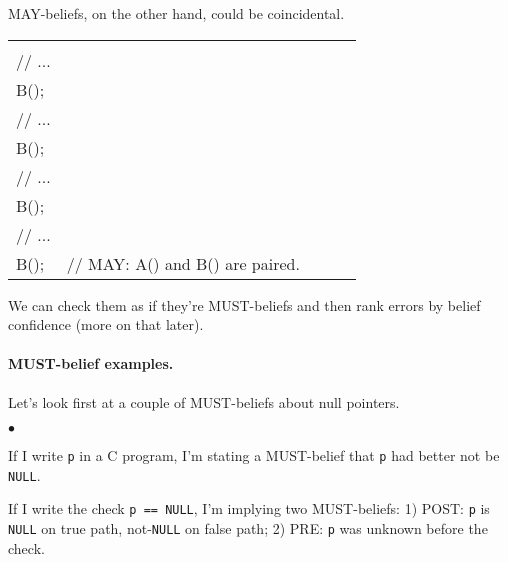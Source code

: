\documentclass[11pt]{article}
\newcommand{\squishlist}{
 \begin{list}{$\bullet$}
  { \setlength{\itemsep}{0pt}
     \setlength{\parsep}{3pt}
     \setlength{\topsep}{3pt}
     \setlength{\partopsep}{0pt}
     \setlength{\leftmargin}{1.5em}
     \setlength{\labelwidth}{1em}
     \setlength{\labelsep}{0.5em} } }
\newcommand{\squishend}{
  \end{list}  }
\begin{document}
MAY-beliefs, on the other hand, could be coincidental.

\begin{center}
\begin{tabular}{l|l|l|l|l}
\begin{minipage}{5em}
  A();\\
  // ...\\
  B();
\end{minipage} &
\begin{minipage}{5em}
  A();\\
  // ...\\
  B();
\end{minipage} &
\begin{minipage}{5em}
  A();\\
  // ...\\
  B();
\end{minipage} &
\begin{minipage}{5em}
  A();\\
  // ...\\
  B();
\end{minipage} &
\begin{minipage}{20em}
// MAY: A() and B() are paired.
\end{minipage} 
\end{tabular}
\end{center}
We can check them as if they're MUST-beliefs and then rank errors
by belief confidence (more on that later).

\paragraph{MUST-belief examples.} Let's look first at a couple of
MUST-beliefs about null pointers.

\squishlist
\item If I write {\tt *p} in a C program, I'm stating a MUST-belief that
  {\tt p} had better not be {\tt NULL}.
\item If I write the check {\tt p == NULL}, I'm implying two MUST-beliefs:
  1) POST: {\tt p} is {\tt NULL} on true path, not-{\tt NULL} on false path; 2) PRE:
  {\tt p} was unknown before the check.
\squishend
\end{document}
